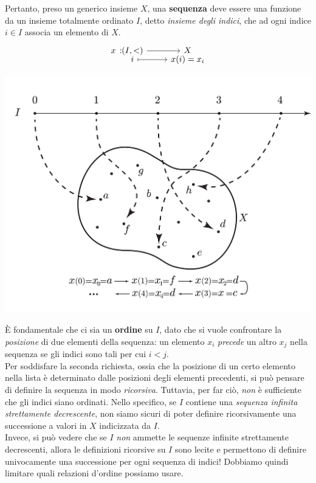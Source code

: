 Pertanto, preso un generico insieme $X$, una \textbf{sequenza} deve essere una funzione da un insieme totalmente ordinato $I$, detto \textit{insieme degli indici}, che ad ogni indice $i\in I$ associa un elemento di $X$.
\begin{equation*}
	\funztot{x}{\left(I,<\right)}{X}{i}{x(i)=x_i}
\end{equation*}
\begin{center}
		\includegraphics[trim=0cm 0cm 0cm 0cm, clip, scale=0.45]{images/settheorygrafico1.pdf}
\end{center}
È fondamentale che ci sia un \textbf{ordine} su $I$, dato che si vuole confrontare la \textit{posizione} di due elementi della sequenza: un elemento $x_i$ \textit{precede} un altro $x_j$ nella sequenza se gli indici sono tali per cui $i<j$.\\
Per soddisfare la seconda richiesta, ossia che la posizione di un certo elemento nella lista è determinato dalle posizioni degli elementi precedenti, si può pensare di definire la sequenza in modo \textit{ricorsiva}.
Tuttavia, per far ciò, \textit{non} è sufficiente che gli indici siano ordinati. Nello specifico, se $I$ contiene una \textit{sequenza infinita strettamente decrescente}, non siamo sicuri di poter definire ricorsivamente una successione a valori in $X$ indicizzata da $I$.\\
Invece, si può vedere che se $I$ \textit{non} ammette le sequenze infinite strettamente decrescenti, allora le definizioni ricorsive su $I$ sono lecite e permettono di definire univocamente una successione per ogni sequenza di indici! Dobbiamo quindi limitare quali relazioni d'ordine possiamo usare.
